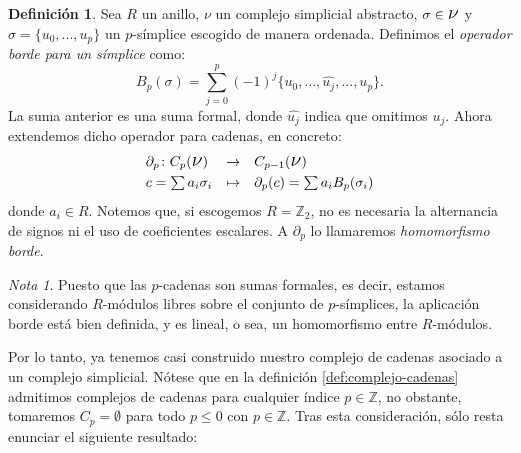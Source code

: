 \documentclass[12pt, a4paper, twoside]{book}
\numberwithin{equation}{section}
\theoremstyle{definition}
\newtheorem{defi}{Definición}[section]
\theoremstyle{remark}
\newtheorem*{remark}{Nota}
\theoremstyle{plain}
\begin{document}
	\begin{defi}
		Sea $R$ un anillo, {\Large $\nu$} un complejo simplicial 
		abstracto, $\sigma \in \text{{\Large $\nu$}}$ y 
		$\sigma = \{u_{0},...,u_{p}\}$ un 
		$p$-símplice escogido de manera ordenada. 
		Definimos el \textit{operador borde para un símplice}
		como:
		$$
		B_{p}(\sigma)=\displaystyle 
		\sum_{j=0}^{p}(-1)^{j}\{u_{0},...,\widehat{u_{j}},...,u_{p}\}.
		$$
 		La suma anterior es una suma formal, donde $\widehat{u_{j}}$ 
		indica que omitimos $u_{j}$. Ahora extendemos dicho operador 
		para cadenas, en concreto:
	\begin{equation}
		\label{def:borde_form}
		\begin{array}{lll}
			\partial_{p}\colon C_{p}(\text{{\Large $\nu$}}) & 
				\rightarrow & C_{p-1}(\text{{\Large $\nu$}})
				\\[3pt] 
				\multicolumn{1}{r}{c=\sum a_{i}\sigma_{i}} & 
				\mapsto & 
				\partial_{p}(c)=\sum a_{i}B_{p}(\sigma_{i})
		\end{array}
	\end{equation}
	donde $a_{i} \in R$. Notemos que, si escogemos $R=\mathbb{Z}_{2}$, no 
	es necesaria la alternancia de signos ni el uso de coeficientes 
	escalares. A $\partial_{p}$ lo llamaremos \textit{homomorfismo borde}.	
	\end{defi}

	\begin{remark}
	Puesto que las $p$-cadenas son sumas formales, es decir, estamos 
	considerando $R$-módulos libres sobre el conjunto de $p$-símplices, la 
	aplicación borde está bien definida, y es lineal, o sea, un 
	homomorfismo entre $R$-módulos.
	\end{remark}


	Por lo tanto, ya tenemos casi construido nuestro complejo de cadenas 
	asociado a un complejo simplicial. Nótese que en la definición 
	\ref{def:complejo-cadenas} admitimos complejos de cadenas para 
	cualquier índice $p \in \mathbb{Z}$, no obstante, tomaremos 
	$C_{p}=\emptyset$ para todo $p\leq0$ con $p \in \mathbb{Z}$. Tras esta 
	consideración, sólo resta enunciar el siguiente resultado:
\end{document}
